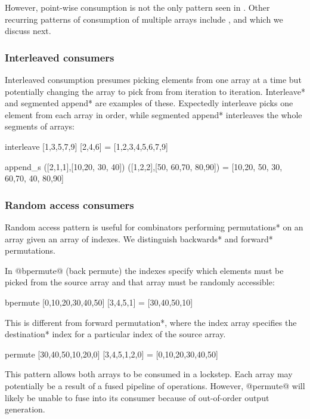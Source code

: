 \documentclass[preamble.tex]{subfiles}
\begin{document}
However, point-wise consumption is not the only pattern seen in \DPH. Other recurring patterns of consumption of multiple arrays include ,  and  which we discuss next.


\subsubsection{Interleaved consumers}

Interleaved consumption presumes picking elements from one array at a time but potentially changing the array to pick from from iteration to iteration. \*Interleave* and \*segmented append* are examples of these. Expectedly interleave picks one element from each array in order, while \*segmented append* interleaves the whole segments of arrays:

\begin{hscode}
interleave [1,3,5,7,9] [2,4,6] = [1,2,3,4,5,6,7,9]

append_s ([2,1,1],[10,20, 30, 40]) ([1,2,2],[50, 60,70, 80,90])
  = [10,20, 50, 30, 60,70, 40, 80,90]
\end{hscode}


\subsubsection{Random access consumers}

Random access pattern is useful for combinators performing \*permutations* on an array given an array of indexes. We distinguish \*backwards* and \*forward* permutations.

In @bpermute@ (back permute) the indexes specify which elements must be picked from the source array and that array must be randomly accessible:

\begin{hscode}
bpermute [0,10,20,30,40,50] [3,4,5,1] = [30,40,50,10]
\end{hscode}

This is different from \*forward permutation*, where the index array specifies the \*destination* index for a particular index of the source array.

\begin{hscode}
permute [30,40,50,10,20,0] [3,4,5,1,2,0] = [0,10,20,30,40,50]
\end{hscode}

This pattern allows both arrays to be consumed in a lockstep. Each array may potentially be a result of a fused pipeline of operations. However, @permute@ will likely be unable to fuse into its consumer because of out-of-order output generation.
\end{document}
